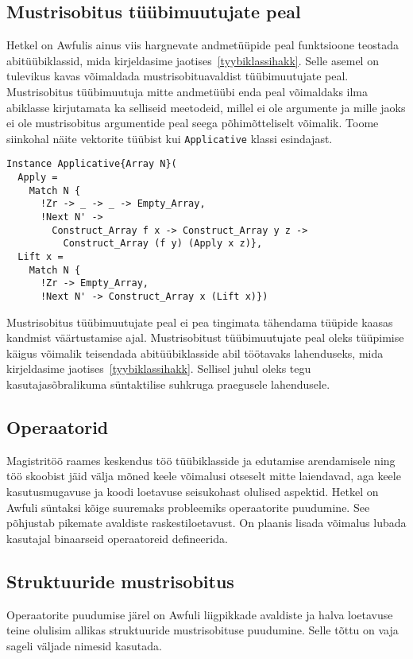 \documentclass[12pt]{article}
\begin{document}
    \subsection{Mustrisobitus tüübimuutujate peal}\label{eemaldadatyybiklassihakk}
      Hetkel on Awfulis ainus viis hargnevate andmetüüpide peal funktsioone teostada abitüübiklassid, mida kirjeldasime jaotises~\ref{tyybiklassihakk}. Selle asemel on tulevikus kavas võimaldada mustrisobituavaldist tüübimuutujate peal. Mustrisobitus tüübimuutuja mitte andmetüübi enda peal võimaldaks ilma abiklasse kirjutamata ka selliseid meetodeid, millel ei ole argumente ja mille jaoks ei ole mustrisobitus argumentide peal seega põhimõtteliselt võimalik. Toome siinkohal näite vektorite tüübist kui \verb!Applicative! klassi esindajast.

      \begin{verbatim}Instance Applicative{Array N}(
  Apply =
    Match N {
      !Zr -> _ -> _ -> Empty_Array,
      !Next N' ->
        Construct_Array f x -> Construct_Array y z ->
          Construct_Array (f y) (Apply x z)},
  Lift x =
    Match N {
      !Zr -> Empty_Array,
      !Next N' -> Construct_Array x (Lift x)})\end{verbatim}

      Mustrisobitus tüübimuutujate peal ei pea tingimata tähendama tüüpide kaasas kandmist väärtustamise ajal. Mustrisobitust tüübimuutujate peal oleks tüüpimise käigus võimalik teisendada abitüübiklasside abil töötavaks lahenduseks, mida kirjeldasime jaotises~\ref{tyybiklassihakk}. Sellisel juhul oleks tegu kasutajasõbralikuma süntaktilise suhkruga praegusele lahendusele.
    \subsection{Operaatorid}
      Magistritöö raames keskendus töö tüübiklasside ja edutamise arendamisele ning töö skoobist jäid välja mõned keele võimalusi otseselt mitte laiendavad, aga keele kasutusmugavuse ja koodi loetavuse seisukohast olulised aspektid. Hetkel on Awfuli süntaksi kõige suuremaks probleemiks operaatorite puudumine. See põhjustab pikemate avaldiste raskestiloetavust. On plaanis lisada võimalus lubada kasutajal binaarseid operaatoreid defineerida.
    \subsection{Struktuuride mustrisobitus}
      Operaatorite puudumise järel on Awfuli liigpikkade avaldiste ja halva loetavuse teine olulisim allikas struktuuride mustrisobituse puudumine. Selle tõttu on vaja sageli väljade nimesid kasutada.
\end{document}
